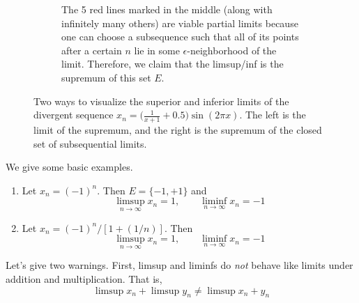 \begin{definition}
\begin{figure}[H]
\begin{subfigure}[b]{0.48\textwidth}
        \caption{The 5 red lines marked in the middle (along with infinitely many others) are viable partial limits because one can choose a subsequence such that all of its points after a certain $n$ lie in some $\epsilon$-neighborhood of the limit. Therefore, we claim that the limsup/inf is the supremum of this set $E$.}
        \label{fig:limsupinf2}
      \end{subfigure}
      \caption{Two ways to visualize the superior and inferior limits of the divergent sequence $x_n = \big(\frac{1}{x+1} + 0.5\big) \sin(2\pi x)$. The left is the limit of the supremum, and the right is the supremum of the closed set of subsequential limits.} 
      \label{fig:limsupinf}
    \end{figure}
  \end{definition}

  \begin{example}
    We give some basic examples. 
    \begin{enumerate}
      \item Let $x_n = (-1)^n$. Then $E = \{-1, +1\}$ and 
      \begin{equation}
        \limsup_{n \rightarrow \infty} x_n = 1, \qquad \liminf_{n \rightarrow \infty} x_n = -1 
      \end{equation}

      \item Let $x_n = (-1)^n / [1 + (1/n)]$. Then 
      \begin{equation}
        \limsup_{n \rightarrow \infty} x_n = 1, \qquad \liminf_{n \rightarrow \infty} x_n = -1
      \end{equation}
    \end{enumerate}
  \end{example}

  Let's give two warnings. First, limsup and liminfs do \textit{not} behave like limits under addition and multiplication. That is, 
  \begin{equation}
    \limsup x_n + \limsup y_n \neq \limsup x_n + y_n 
  \end{equation}

